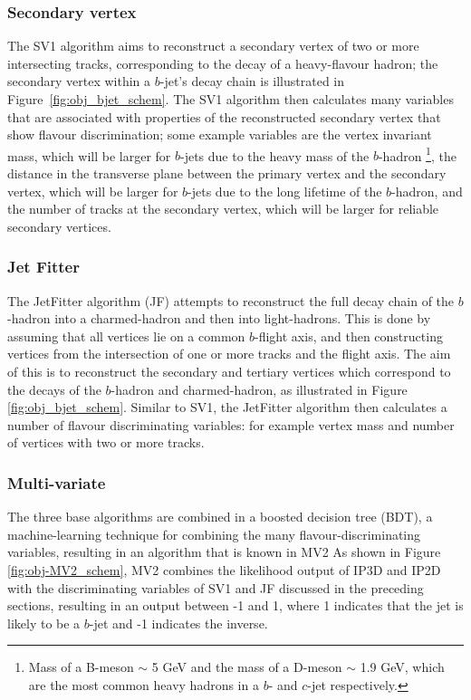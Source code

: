 \subsubsection{Secondary vertex}
\label{sec:obj-bjet_SV}


The SV1 algorithm aims to reconstruct a secondary vertex of two or more intersecting tracks, corresponding to the decay of a heavy-flavour hadron;
the secondary vertex within a $b$-jet's decay chain is illustrated in Figure~\ref{fig:obj_bjet_schem}.
The SV1 algorithm then calculates many variables that are associated with properties of the reconstructed secondary vertex that show flavour discrimination;
some example variables are the vertex invariant mass,
which will be larger for $b$-jets due to the heavy mass of the $b$-hadron
\footnote{Mass of a B-meson $\sim$ 5 GeV and the mass of a D-meson $\sim$ 1.9 GeV, which are the most common heavy hadrons in a $b$- and $c$-jet respectively.}, 
the distance in the transverse plane between the primary vertex and the secondary vertex, %
which will be larger for $b$-jets due to the long lifetime of the $b$-hadron,
and the number of tracks at the secondary vertex, which will be larger for reliable secondary vertices.

\subsubsection{Jet Fitter}
\label{sec:obj-bjet_JF}

The JetFitter algorithm (JF) attempts to reconstruct the full decay chain of the $b$-hadron into a charmed-hadron and then into light-hadrons. 
This is done by assuming that all vertices lie on a common $b$-flight axis, and then constructing vertices from the intersection of
one or more tracks and the flight axis.
The aim of this is to reconstruct the secondary and tertiary vertices which correspond to the decays of the $b$-hadron and charmed-hadron,
as illustrated in Figure \ref{fig:obj_bjet_schem}.
Similar to SV1, the JetFitter algorithm then calculates a number of flavour discriminating variables:
for example vertex mass and number of vertices with two or more tracks.

\subsubsection{Multi-variate}
\label{sec:obj-bjet_MV2}

The three base algorithms are combined in a boosted decision tree (BDT), a machine-learning technique for combining the many flavour-discriminating variables,
resulting in an algorithm that is known in MV2
As shown in Figure \ref{fig:obj-MV2_schem}, MV2 combines the likelihood output of IP3D and IP2D
with the discriminating variables of SV1 and JF discussed in the preceding sections,
resulting in an output between -1 and 1, where 1 indicates that the jet is likely to be a $b$-jet and -1 indicates the inverse.

